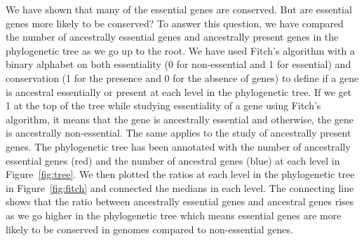 \documentclass[12pt,letterpaper]{article}
\begin{document}
We have shown that many of the essential genes are conserved. But are essential genes more likely to be conserved? To answer this question, we have compared the number of ancestrally essential genes and ancestrally present genes in the phylogenetic tree as we go up to the root. We have used Fitch's algorithm \cite{fitch_toward_1971} with a binary alphabet on both essentiality (0 for non-essential and 1 for essential) and conservation (1 for the presence and 0 for the absence of genes) to define if a gene is ancestral essentially or present at each level in the phylogenetic tree. If we get 1 at the top of the tree while studying essentiality of a gene using Fitch's algorithm, it means that the gene is ancestrally essential and otherwise, the gene is ancestrally non-essential. The same applies to the study of ancestrally present genes. The phylogenetic tree has been annotated with the number of ancestrally essential genes (red) and the number of ancestral genes (blue) at each level in Figure~\ref{fig:tree}. We then plotted the ratios at each level in the phylogenetic tree in Figure~\ref{fig:fitch} and connected the medians in each level. The connecting line shows that the ratio between ancestrally essential genes and ancestral genes rises as we go higher in the phylogenetic tree which means essential genes are more likely to be conserved in genomes compared to non-essential genes.
\end{document}
